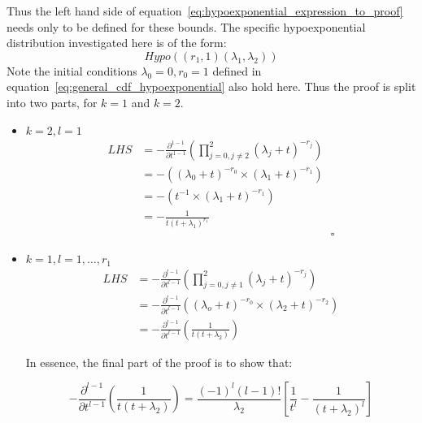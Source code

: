 Thus the left hand side of equation~\eqref{eq:hypoexponential_expression_to_proof}
needs only to be defined for these bounds.
The specific hypoexponential distribution investigated here is of the form:
\[
    Hypo((r_1, 1)(\lambda_1, \lambda_2))
\]
Note the initial conditions \(\lambda_0=0, r_0=1\) defined in
equation~\eqref{eq:general_cdf_hypoexponential} also hold here.
Thus the proof is split into two parts, for \(k=1\) and \(k=2\).



\begin{itemize}
    \item \(k = 2, l = 1\)
    \begin{equation*}
        \begin{split}
            LHS &= - \frac{\partial^{1-1}}{\partial t^{1-1}}
            \left( \prod_{j=0, j \neq 2}^{2} (\lambda_j + t)^{-r_j} \right) \\
            &=-\left( (\lambda_0 + t)^{-r_0} \times (\lambda_1 + t)^{-r_1}
            \right) \\
            &=-\left( t^{-1} \times (\lambda_1 + t)^{-r_1} \right) \\
            &= - \frac{1}{t(t + \lambda_1)^{r_1}} \\
            & \hspace{7cm} \square
        \end{split}
    \end{equation*}
    \item \(k = 1, l = 1, \dots, r_1\)
    \begin{equation*}
        \begin{split}
            LHS &= -\frac{\partial^{l-1}}{\partial t^{l-1}}
            \left( \prod_{j=0, j \neq 1}^{2} (\lambda_j + t)^{-r_j} \right) \\
            &= -\frac{\partial^{l-1}}{\partial t^{l-1}}
            \left( (\lambda_o + t)^{-r_0} \times (\lambda_2 + t)^{-r_2}
            \right) \\
            &= -\frac{\partial^{l-1}}{\partial t^{l-1}}
            \left( \frac{1}{t(t + \lambda_2)}\right)
        \end{split}
    \end{equation*}

    In essence, the final part of the proof is to show that:

    \[
        -\frac{\partial^{l-1}}{\partial t^{l-1}}
        \left( \frac{1}{t(t + \lambda_2)}\right) =
        \frac{(-1)^{l} (l-1)!}{\lambda_2}\left[\frac{1}{t^l} - \frac{1}{(t +
        \lambda_2)^l}\right]
    \]


\end{itemize}
